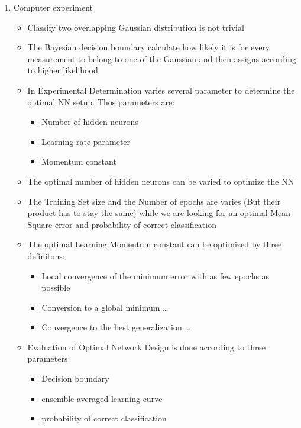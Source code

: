 \documentclass{scrartcl}
\begin{document}
\begin{enumerate}
\item Computer experiment
	\begin{itemize}
	\item Classify two overlapping Gaussian distribution is not trivial
	\item The Bayesian decision boundary calculate how likely it is for every measurement to belong to one of the Gaussian and then assigns according to higher likelihood
	\item In Experimental Determination varies several parameter to determine the optimal NN setup. Thos parameters are:
		\begin{itemize}
		\item Number of hidden neurons
		\item Learning rate parameter
		\item Momentum constant
		\end{itemize}
	\item The optimal number of hidden neurons can be varied to optimize the NN
	\item The Training Set size and the Number of epochs are varies (But their product has to stay the same) while we are looking for an optimal Mean Square error and probability of correct classification
	\item The optimal Learning Momentum constant can be optimized by three definitons:
		\begin{itemize}
		\item Local convergence of the minimum error with as few epochs as possible
		\item Conversion to a global minimum \dots
		\item Convergence to the best generalization \dots
		\end{itemize}
	\item Evaluation of Optimal Network Design is done according to three parameters:
		\begin{itemize}
		\item Decision boundary
		\item ensemble-averaged learning curve
		\item probability of correct classification
		\end{itemize}
 	\end{itemize}
	

\end{enumerate}
\end{document}
